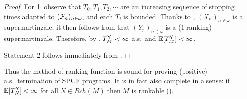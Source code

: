 \begin{proof}
For 1, observe that $T_0, T_1, T_2, \cdots$ are an increasing sequence of stopping times adapted to $(\mathcal{F}_n)_{n \in \omega}$, and each $T_i$ is bounded.
Thanks to , 
$(X_n)_{n \in \omega}$ is a supermartingale;
it then follows from  that $(Y_n)_{n \in \omega}$ is a ($1$-ranking) supermartingale.
Therefore, by , $T^{\textsf{Y}}_M < \infty$ a.s.~and $\mathbb{E}[T^{\textsf{Y}}_M] < \infty$.

Statement 2 follows immediately from .
\end{proof}

Thus the method of ranking function is sound for proving (positive) a.s.~termination of SPCF programs.
It is in fact also complete in a sense: if $\mathbb{E}[T^{\textsf{Y}}_N] < \infty$ for all $N \in \mathit{Rch}(M)$ then $M$ is rankable ().
